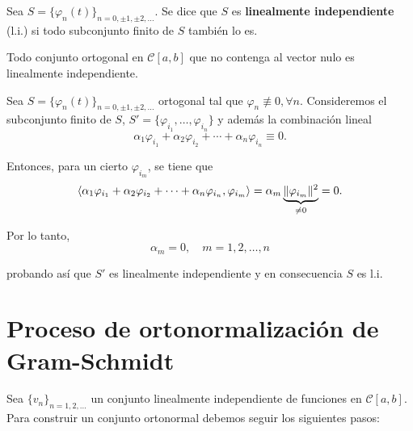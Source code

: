 \begin{defi}
Sea $S = \{\varphi_n(t)\}_{n=0, \pm 1, \pm 2, \dots}$. Se dice que $S$ es \textbf{linealmente independiente} (l.i.) si todo subconjunto finito de $S$ también lo es.
\end{defi}

\begin{propo} \label{LIortogonal}
Todo conjunto ortogonal en $\mathscr{C}[a,b]$ que no contenga al vector nulo es linealmente independiente.
\end{propo}

\begin{demo}
Sea $S = \{\varphi_n(t)\}_{n=0, \pm 1, \pm 2, \dots}$ ortogonal tal que $\varphi_n \not\equiv 0, \forall n$. Consideremos el subconjunto finito de $S$, $S' = \{\varphi_{i_1}, \dots, \varphi_{i_n}\}$ y además la combinación lineal
$$\alpha_1 \varphi_{i_1} + \alpha_2 \varphi_{i_2} + \cdots + \alpha_n \varphi_{i_n} \equiv 0.$$

Entonces, para un cierto $\varphi_{i_m}$, se tiene que
$$\langle \alpha_1 \varphi_{i_1} + \alpha_2 \varphi_{i_2} + \cdots + \alpha_n \varphi_{i_n},\varphi_{i_m} \rangle = \alpha_m \underbrace{\lVert\varphi_{i_m}\rVert^2}_{\neq 0} = 0.$$

Por lo tanto, 
$$\alpha_m = 0, \quad m = 1, 2, \dots, n$$

probando así que $S'$ es linealmente independiente y en consecuencia $S$ es l.i.
\end{demo}

\section{Proceso de ortonormalización de Gram-Schmidt}

Sea $\{v_n\}_{n = 1,2, \dots}$ un conjunto linealmente independiente de funciones en $\mathscr{C}[a,b]$. Para construir un conjunto ortonormal debemos seguir los siguientes pasos:

